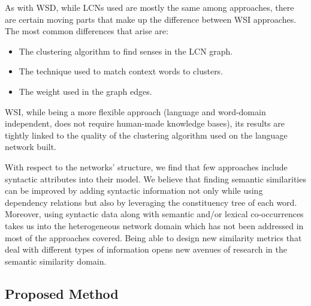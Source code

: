 As with WSD, while  LCNs used are mostly the same among approaches, there are certain moving parts that make up the difference between WSI approaches. The most common differences that   arise are:

\begin{itemize}
\item The clustering algorithm to find senses in the LCN graph.
\item The technique used to match context words to clusters.
\item The weight used in the graph edges.
\end{itemize}


WSI, while being a more flexible approach (language and word-domain independent, does not require human-made knowledge bases), its results are tightly linked to the quality of the clustering algorithm used on the language network built. 
%



With respect to the networks' structure, we find that few approaches include syntactic attributes into their model. We believe that finding semantic similarities can be improved by adding syntactic information not only  while using dependency relations but also by leveraging the constituency tree of each word. Moreover, using syntactic data along with semantic and/or lexical co-occurrences takes us into the heterogeneous network domain which has not been addressed in most of the approaches covered.
Being able to design new similarity metrics that deal with different types of information opens new avenues of research in the semantic similarity domain. %




\subsection{Proposed Method}
	


